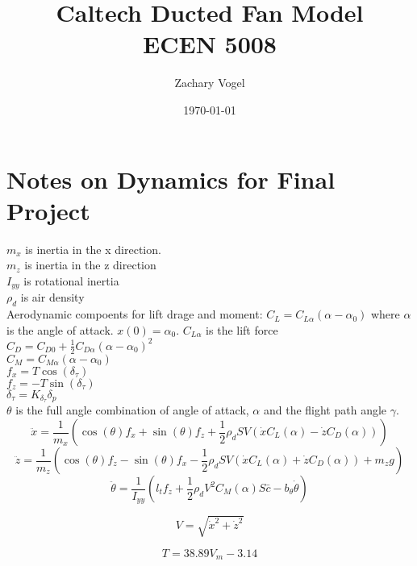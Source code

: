 \documentclass{article}
\author{Zachary Vogel}
\title{Caltech Ducted Fan Model\\ ECEN 5008}
\date{\today}
\begin{document}
\maketitle
\section{Notes on Dynamics for Final Project}
$m_x$ is inertia in the x direction.\\
$m_z$ is inertia in the z direction\\
$I_{yy}$ is rotational inertia\\
$\rho_d$ is air density\\

Aerodynamic compoents for lift drage and moment:
$C_L=C_{L\alpha}(\alpha-\alpha_0)$ where $\alpha$ is the angle of attack. $x(0)=\alpha_0$. $C_{L\alpha}$ is the lift force\\
$C_D=C_{D0}+\frac{1}{2}C_{D\alpha}(\alpha-\alpha_0)^2$\\
$C_M=C_{M\alpha}(\alpha-\alpha_0)$\\

$f_x=T\cos(\delta_\tau)$\\
$f_z=-T\sin(\delta_\tau)$\\
$\delta_\tau=K_{\delta_\tau}\delta_p$\\

$\theta$ is the full angle combination of angle of attack, $\alpha$ and the flight path angle $\gamma$.\\

\[\ddot{x}=\frac{1}{m_x}\left (\cos(\theta)f_x+\sin(\theta)f_z+\frac{1}{2}\rho_dSV(\dot{x}C_L(\alpha)-\dot{z}C_D(\alpha))\right)\]
\[\ddot{z}=\frac{1}{m_z}\left (\cos(\theta)f_z-\sin(\theta)f_x-\frac{1}{2}\rho_dSV(\dot{x}C_L(\alpha)+\dot{z}C_D(\alpha))+m_zg\right )\]
\[\ddot{\theta}=\frac{1}{I_{yy}}\left (l_tf_z+\frac{1}{2}\rho_dV^2C_M(\alpha)S\bar{c}-b_\theta\dot{\theta}\right )\]


\[V=\sqrt{\dot{x}^2+\dot{z}^2}\]

\[T=38.89V_m-3.14\]
\end{document}
